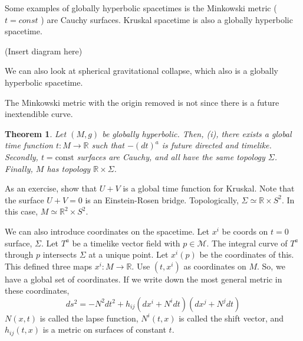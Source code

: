 \documentclass[11pt, oneside]{article}   	%
\theoremstyle{slanted}
\newtheorem*{thm}{Theorem}
\begin{document}
Some examples of globally hyperbolic spacetimes 
is the Minkowski metric ($ t = const  $  )
are Cauchy surfaces. 
Kruskal spacetime is also a globally hyperbolic 
spacetime. 

(Insert diagram here)

We can also look 
at spherical gravitational 
collapse, 
which also is a globally hyperbolic spacetime. 

The Minkowski metric 
with the origin removed is not since 
there is a future inextendible curve. 

\begin{thm}
	Let $ \left( M , g  \right)  $ be globally hyperbolic.
	Then, (i), there exists a global time function 
	$ t : M \to \mathbb{ R } $ such that 
	$  - \left( dt  \right)  ^ a $ is future directed and timelike. 
	Secondly, $ t = \text{const}$ surfaces are Cauchy, 
	and all have the same topology $ \Sigma $. 
	Finally, $ M $ has topology $ \mathbb{ R } \times \Sigma $. 
\end{thm}
As an exercise, show that $ U + V $ is a global
time function for Kruskal. 
Note that the surface $ U + V  = 0 $ is an 
Einstein-Rosen bridge. 
Topologically, $ \Sigma \simeq \mathbb{ R } \times S ^ 2 $. 
In this case, $ M \simeq \mathbb{ R  }^ 2 \times S ^ 2 $. 

We can also introduce coordinates on the spacetime. 
Let  $ x ^ i $ be coords on $ t =0 $ surface, $ \Sigma $. 
Let $ T ^ a $ be a timelike vector field with $ p \in \mathcal{ M  } $. 
The integral curve of $ T ^ a  $ through $ p $ 
intersects $ \Sigma $ at a unique point. Let $ x ^ i(p) $ 
be the coordinates of this. 
This defined three maps $ x ^ i: M \to \mathbb{ R  }$. 
Use $ \left( t, x ^ i  \right)   $ as 
coordinates on $ M $. 
So, we have a global 
set of coordinates. 
If we write down the most general 
metric in these coordinates, 
\[
 ds ^ 2  =  - N ^ 2 dt ^2 + h _{ ij } 
 \left(  d x^ i + N ^ i dt  \right)  \left( dx ^ j  + N ^ j dt  \right)  
\] $ N \left( x, t  \right)  $ 
is called the lapse function, $ N ^ i \left( t, x  \right)   $ 
is called the shift vector, 
and $ h _{ ij  } \left( t, x  \right)  $ 
is a metric on surfaces of constant $ t $.
\end{document}
